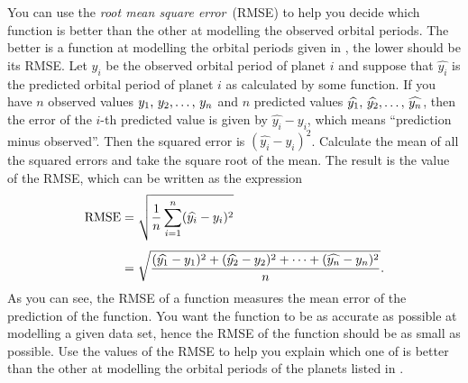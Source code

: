 \documentclass[a4paper,oneside,12pt]{article}
\begin{document}
\begin{problem}
\begin{packedenum}
  \item\label{subprob:planetary_orbit_RMS_error}
    You can use the \emph{root mean square error}~(RMSE) to help you
    decide which function is better than the other at modelling the
    observed orbital periods.  The better is a function at modelling
    the orbital periods given in ,
    the lower should be its RMSE.  Let $y_i$ be the observed orbital
    period of planet $i$ and suppose that $\widehat{y_i}$ is the
    predicted orbital period of planet $i$ as calculated by some
    function.  If you have $n$ observed values ${y_1},\, {y_2}, \dots,\, {y_n}$
    and $n$ predicted values
    ${\widehat{y_1}},\, {\widehat{y_2}}, \dots,\, {\widehat{y_n}}$, then the
    error of the $i$-th predicted value is given by
    $\widehat{y_i} - y_i$, which means ``prediction minus observed''.
    Then the squared error is $(\widehat{y_i} - y_i)^2$.  Calculate
    the mean of all the squared errors and take the square root of the
    mean.  The result is the value of the RMSE, which can be written
    as the expression
    \begin{align*}
    \text{RMSE}
    &=
    \sqrt{
      \frac{1}{n}
      \sum_{i=1}^n (\widehat{y_i} - y_i)^2
    } \\[4pt]
    &=
    \sqrt{
      \frac{
        {
          (\widehat{y_1} - y_1)^2
        } + {
          (\widehat{y_2} - y_2)^2
        } + \cdots + {
          (\widehat{y_n} - y_n)^2
        }
      }{
        n
      }
    }.
    \end{align*}
    As you can see, the RMSE of a function measures the mean error of
    the prediction of the function.  You want the function to be as
    accurate as possible at modelling a given data set, hence the
    RMSE of the function should be as small as possible.  Use the
    values of the RMSE to help you explain which one of
    is better than the other at modelling the orbital periods of the
    planets listed in .
  \end{packedenum}
\end{problem}
\end{document}
